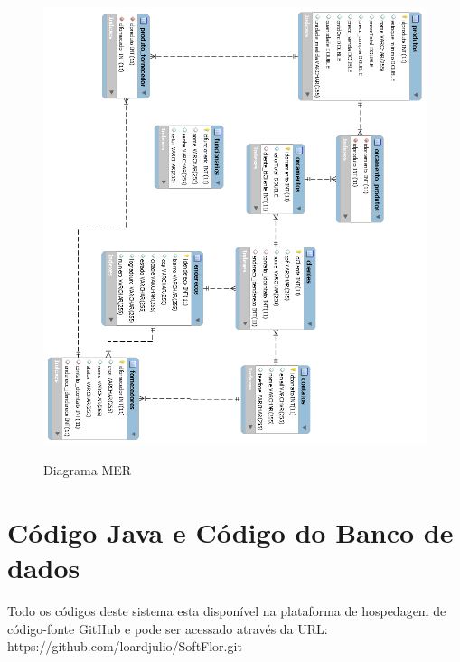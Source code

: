\begin{anexosenv}
\begin{figure}[H]
\centering
\caption{Diagrama MER}
\includegraphics[width=17cm]{imagens/diagramas/bd}
\label{fig:Diagrama MER}
\end{figure}

\chapter{Código Java e Código do Banco de dados}
	Todo os códigos deste sistema esta disponível na plataforma de hospedagem de código-fonte GitHub e pode ser acessado através da URL: https://github.com/loardjulio/SoftFlor.git
	
\end{anexosenv}